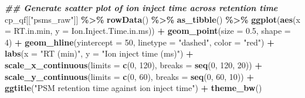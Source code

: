 \documentclass[9pt,a4paper,]{extarticle}
\newenvironment{Shaded}{\begin{snugshade}}{\end{snugshade}}
\newcommand{\AttributeTok}[1]{\textcolor[rgb]{0.13,0.29,0.53}{#1}}
\newcommand{\DecValTok}[1]{\textcolor[rgb]{0.00,0.00,0.81}{#1}}
\newcommand{\DocumentationTok}[1]{\textcolor[rgb]{0.56,0.35,0.01}{\textbf{\textit{#1}}}}
\newcommand{\FloatTok}[1]{\textcolor[rgb]{0.00,0.00,0.81}{#1}}
\newcommand{\FunctionTok}[1]{\textcolor[rgb]{0.13,0.29,0.53}{\textbf{#1}}}
\newcommand{\NormalTok}[1]{#1}
\newcommand{\SpecialCharTok}[1]{\textcolor[rgb]{0.81,0.36,0.00}{\textbf{#1}}}
\newcommand{\StringTok}[1]{\textcolor[rgb]{0.31,0.60,0.02}{#1}}
\begin{document}
\begin{Shaded}
\begin{Highlighting}[]
\DocumentationTok{\#\# Generate scatter plot of ion inject time across retention time}
\NormalTok{cp\_qf[[}\StringTok{"psms\_raw"}\NormalTok{]] }\SpecialCharTok{\%\textgreater{}\%}
  \FunctionTok{rowData}\NormalTok{() }\SpecialCharTok{\%\textgreater{}\%} 
  \FunctionTok{as\_tibble}\NormalTok{() }\SpecialCharTok{\%\textgreater{}\%}
  \FunctionTok{ggplot}\NormalTok{(}\FunctionTok{aes}\NormalTok{(}\AttributeTok{x =}\NormalTok{ RT.in.min, }\AttributeTok{y =}\NormalTok{ Ion.Inject.Time.in.ms)) }\SpecialCharTok{+}
  \FunctionTok{geom\_point}\NormalTok{(}\AttributeTok{size =} \FloatTok{0.5}\NormalTok{, }\AttributeTok{shape =} \DecValTok{4}\NormalTok{) }\SpecialCharTok{+}
  \FunctionTok{geom\_hline}\NormalTok{(}\AttributeTok{yintercept =} \DecValTok{50}\NormalTok{, }\AttributeTok{linetype =} \StringTok{"dashed"}\NormalTok{, }\AttributeTok{color =} \StringTok{"red"}\NormalTok{) }\SpecialCharTok{+}
  \FunctionTok{labs}\NormalTok{(}\AttributeTok{x =} \StringTok{"RT (min)"}\NormalTok{, }\AttributeTok{y =} \StringTok{"Ion inject time (ms)"}\NormalTok{) }\SpecialCharTok{+}
  \FunctionTok{scale\_x\_continuous}\NormalTok{(}\AttributeTok{limits =} \FunctionTok{c}\NormalTok{(}\DecValTok{0}\NormalTok{, }\DecValTok{120}\NormalTok{), }\AttributeTok{breaks =} \FunctionTok{seq}\NormalTok{(}\DecValTok{0}\NormalTok{, }\DecValTok{120}\NormalTok{, }\DecValTok{20}\NormalTok{)) }\SpecialCharTok{+}
  \FunctionTok{scale\_y\_continuous}\NormalTok{(}\AttributeTok{limits =} \FunctionTok{c}\NormalTok{(}\DecValTok{0}\NormalTok{, }\DecValTok{60}\NormalTok{), }\AttributeTok{breaks =} \FunctionTok{seq}\NormalTok{(}\DecValTok{0}\NormalTok{, }\DecValTok{60}\NormalTok{, }\DecValTok{10}\NormalTok{)) }\SpecialCharTok{+}
  \FunctionTok{ggtitle}\NormalTok{(}\StringTok{"PSM retention time against ion inject time"}\NormalTok{) }\SpecialCharTok{+}
  \FunctionTok{theme\_bw}\NormalTok{()}
\end{Highlighting}
\end{Shaded}
\end{document}
